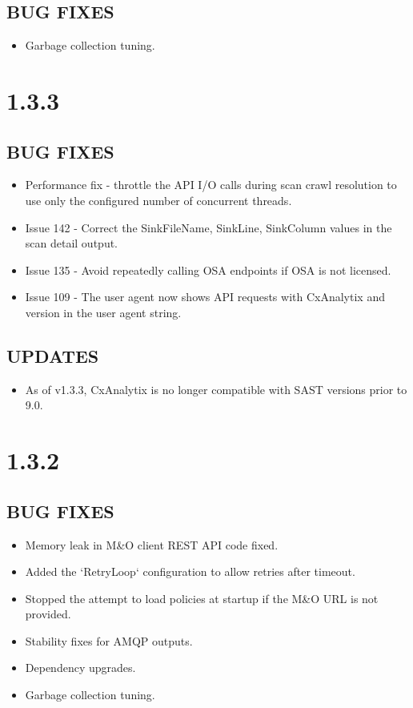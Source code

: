 \subsection*{BUG FIXES}
    \begin{itemize}
        \item Garbage collection tuning.
    \end{itemize}


\section{1.3.3}
\subsection*{BUG FIXES}
    \begin{itemize}
        \item Performance fix - throttle the API I/O calls during scan crawl resolution to use only the configured number of concurrent threads.
        \item Issue 142 - Correct the SinkFileName, SinkLine, SinkColumn values in the scan detail output.
        \item Issue 135 - Avoid repeatedly calling OSA endpoints if OSA is not licensed.
        \item Issue 109 - The user agent now shows API requests with CxAnalytix and version in the user agent string.
    \end{itemize}

\subsection*{UPDATES}
    \begin{itemize}
        \item As of v1.3.3, CxAnalytix is no longer compatible with SAST versions prior to 9.0.
    \end{itemize}

\section{1.3.2}
\subsection*{BUG FIXES}
    \begin{itemize}
        \item Memory leak in M\&O client REST API code fixed.
        \item Added the `RetryLoop` configuration to allow retries after timeout.
        \item Stopped the attempt to load policies at startup if the M\&O URL is not provided.
        \item Stability fixes for AMQP outputs.
        \item Dependency upgrades.
        \item Garbage collection tuning.
    \end{itemize}


